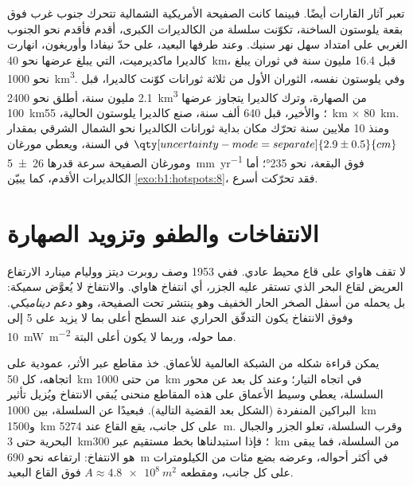 تعبر آثار  القارات أيضًا. فبينما كانت الصفيحة الأمريكية الشمالية تتحرك جنوب غرب فوق بقعة يلوستون الساخنة، تكوّنت سلسلة من الكالديرات الكبرى، أقدم فأقدم نحو الجنوب الغربي على امتداد سهل نهر سنيك. وعند طرفها البعيد، على حدّ نيفادا وأوريغون، انهارت كالديرا ماكديرميت، التي يبلغ عرضها نحو \qty{40}{km}، قبل 16.4 مليون سنة في ثوران يبلغ نحو \qty{1000}{km^3}. وفي يلوستون نفسه، الثوران الأول من ثلاثة ثورانات كوّنت كالديرا، قبل 2.1 مليون سنة، أطلق نحو \qty{2400}{km^3} من الصهارة، وترك كالديرا يتجاوز عرضها \qty{100}{km}؛ والأخير، قبل 640 ألف سنة، صنع كالديرا يلوستون الحالية، \qty{55}{km} × \qty{80}{km}. ومنذ 10 ملايين سنة تحرّك مكان بداية ثورانات الكالديرا نحو الشمال الشرقي بمقدار $\qty[uncertainty-mode=separate]{2.9 \pm 0.5}{cm}$ في السنة، ويعطي مورغان ومورغان الصفيحة سرعة قدرها \qty[uncertainty-mode=separate]{26 \pm 5}{mm.yr^{-1}} فوق البقعة، نحو \ang{235}؛ أما الكالديرات الأقدم، كما يبيّن \cref{exo:b1:hotspots:8}، فقد تحرّكت أسرع.

\section{الانتفاخات والطفو وتزويد الصهارة}\label{sec:b1:hotspots:swells}

لا تقف هاواي على قاع محيط عادي. ففي 1953 وصف روبرت ديتز ووليام مينارد الارتفاع العريض لقاع البحر الذي تستقر عليه الجزر، أي انتفاخ هاواي. والانتفاخ لا يُعوَّض  سميكة: بل يحمله من أسفل الصخر الحار الخفيف  وهو ينتشر تحت الصفيحة، وهو دعم \emph{ديناميكي}. وفوق الانتفاخ يكون التدفّق الحراري عند السطح أعلى بما لا يزيد على 5 إلى \qty{10}{mW.m^{-2}} مما حوله، وربما لا يكون أعلى البتة.

يمكن قراءة شكله من الشبكة العالمية للأعماق. خذ مقاطع عبر الأثر، عمودية على اتجاهه، كل \qty{50}{km} من  حتى \qty{1000}{km} في اتجاه التيار؛ وعند كل بعد عن محور السلسلة، يعطي وسيط الأعماق على هذه المقاطع منحنى يُبقي الانتفاخ ويُزيل تأثير البراكين المنفردة (الشكل بعد القضية التالية). فبعيدًا عن السلسلة، بين \qty{1000}{km} و\qty{1500}{km} على كل جانب، يقع القاع عند \qty{5274}{m}. وقرب السلسلة، تعلو الجزر والجبال البحرية حتى \qty{3}{km}؛ فإذا استبدلناها بخط مستقيم عبر \qty{300}{km} من السلسلة، فما يبقى هو الانتفاخ: ارتفاعه نحو \qty{690}{m} في أكثر أحواله، وعرضه بضع مئات من الكيلومترات على كل جانب، ومقطعه $A \approx \qty{4.8e8}{m^2}$ فوق القاع البعيد.

